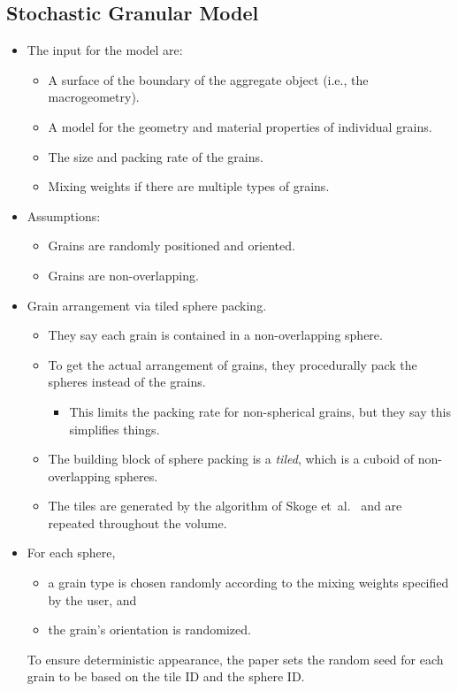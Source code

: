 \documentclass[10pt]{article}
\newcommand{\etal}{{et~al.}}
\begin{document}
  \subsection{Stochastic Granular Model}
  \begin{itemize}
  	\item The input for the model are:
  	\begin{itemize}
  		\item A surface of the boundary of the aggregate object (i.e., the macrogeometry).
  		\item A model for the geometry and material properties of individual grains.
  		\item The size and packing rate of the grains.
  		\item Mixing weights if there are multiple types of grains.
  	\end{itemize}
  	
  	\item Assumptions: 
  	\begin{itemize}
  	  	\item Grains are randomly positioned and oriented.
  	  	\item Grains are non-overlapping.
  	\end{itemize}
  	
  	\item Grain arrangement via tiled sphere packing.
  	\begin{itemize}
  		\item They say each grain is contained in a non-overlapping sphere.

  		\item To get the actual arrangement of grains, they procedurally pack the spheres instead of the grains.  
  		\begin{itemize}
  			\item This limits the packing rate for non-spherical grains, but they say this simplifies things.
  		\end{itemize}

  		\item The building block of sphere packing is a \emph{tiled}, which is a cuboid of non-overlapping spheres.

  		\item The tiles are generated by the algorithm of Skoge \etal\ \cite{Skoge:2006} and are repeated throughout the volume.  	
  	\end{itemize}

  	\item For each sphere,
  	\begin{itemize}
  		\item a grain type is chosen randomly according to the mixing weights specified by the user, and
  		\item the grain's orientation is randomized.
  	\end{itemize}
  	To ensure deterministic appearance, the paper sets the random seed for each grain to be based on the tile ID and the sphere ID.  	
  \end{itemize}
\end{document}
